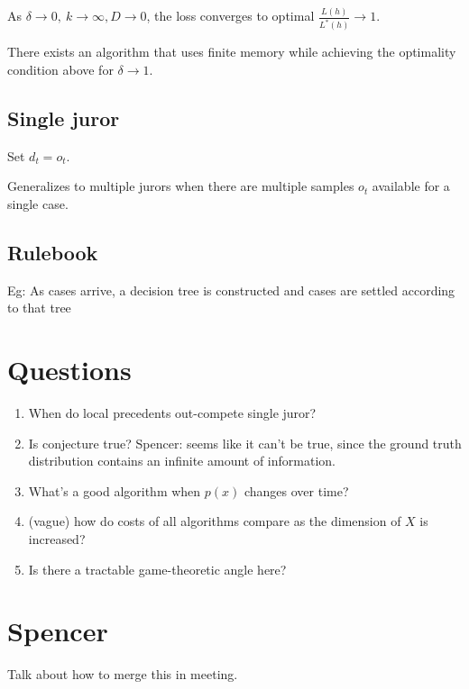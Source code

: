 \documentclass{article}
\begin{document}
\begin{theorem}
As $\delta\rightarrow 0,\ k\rightarrow \infty, D\rightarrow 0$, the loss converges to optimal $\frac{L(h)}{L^*(h)}\rightarrow 1$.
\end{theorem}

\begin{conjecture}
There exists an algorithm that uses finite memory while achieving the optimality condition above for $\delta \rightarrow 1$.
\end{conjecture}

\subsection{Single juror}
Set $d_t=o_t$.

Generalizes to multiple jurors when there are multiple samples $o_t$ available for a single case.

\subsection{Rulebook}

Eg: As cases arrive, a decision tree is constructed and cases are settled according to that tree



\section{Questions }

\begin{enumerate}
\item When do local precedents out-compete single juror?
\item Is conjecture true? Spencer: seems like it can't be true, since the ground truth distribution contains an infinite amount of information.
\item What's a good algorithm when $p(x)$ changes over time?
\item (vague) how do costs of all algorithms compare as the dimension of $X$ is increased?
\item Is there a tractable game-theoretic angle here?
\end{enumerate}

\section{Spencer}

Talk about how to merge this in meeting.
\end{document}
